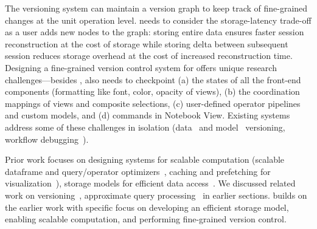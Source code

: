
The \system versioning system can maintain a version graph to keep track of fine-grained changes at the unit operation level. 
\system needs to consider the storage-latency trade-off as a user adds new nodes to the graph: storing entire data ensures faster session reconstruction at the cost of storage while storing delta between subsequent session reduces storage overhead at the cost of increased reconstruction time. 
Designing a fine-grained version control system for \system offers unique research challenges---besides \vitaframe, \system also needs to checkpoint
(a) the states of all the front-end components (\eg formatting like font, color, opacity of views), 
(b) the coordination mappings of views and composite selections, (c) user-defined operator pipelines and custom models, and (d) \vta commands in Notebook View. Existing systems address some of these challenges in isolation (\eg data~\cite{huang2017orpheusdb} and model~\cite{miao2016modelhub} versioning, workflow debugging~\cite{brachmannbyour,miao2016provdb}).



Prior work focuses on designing systems for scalable computation (\eg scalable dataframe and query/operator optimizers~\cite{modin}, caching and prefetching for visualization~\cite{taokyrix}), storage models for efficient data access~\cite{tiledb,raasveldt2020data}.
We discussed related work on versioning~\cite{huang2017orpheusdb,miao2016modelhub,brachmannbyour,miao2016provdb}, approximate query processing~\cite{babcock2003dynamic, agarwal2013blinkdb,acharya1999aqua,rahman2017ve,hellerstein1997online} in earlier sections. \system builds on the earlier work with specific focus on developing an efficient storage model, enabling scalable computation, and performing fine-grained version control. 








